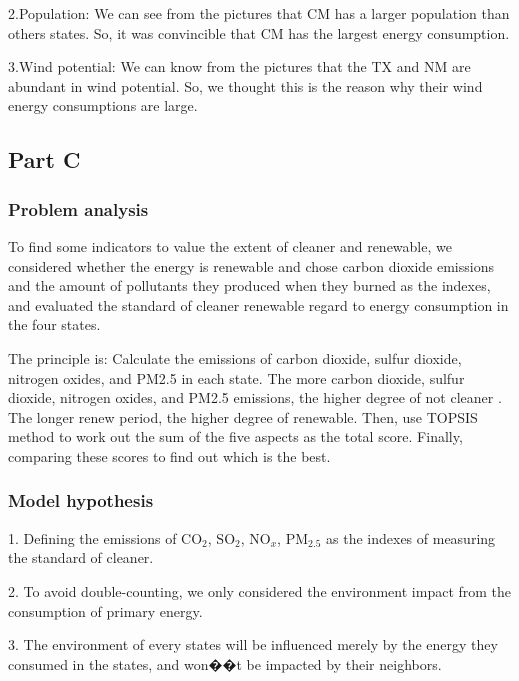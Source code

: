 \documentclass[12pt]{article}
\begin{document}
2.Population:
We can see from the pictures that CM has a larger population than others states.
So, it was convincible that CM has the largest energy consumption.

3.Wind potential:
We can know from the pictures that the TX and NM are abundant in wind potential.
So, we thought this is the reason why their wind energy consumptions are large.






\subsection{Part \uppercase\expandafter{}  C}



\subsubsection{Problem analysis}

To find some indicators to value the extent of cleaner and renewable, we considered whether the energy is renewable and chose carbon dioxide emissions and the amount of pollutants they produced when they burned as the indexes, and evaluated the standard of cleaner renewable regard to energy consumption in the four states.

The principle is: Calculate the emissions of carbon dioxide, sulfur dioxide, nitrogen oxides, and PM2.5 in each state. The more carbon dioxide, sulfur dioxide, nitrogen oxides, and PM2.5 emissions, the higher degree of not cleaner . The longer renew period, the higher degree of renewable. Then, use TOPSIS method to work out the sum of the five aspects as the total score. Finally, comparing these scores to find out which is the best.

\subsubsection{Model hypothesis}

1. Defining the emissions of $\mathrm{CO_{2}}$, $\mathrm{SO_{2}}$, $\mathrm{NO}_{x}$, $\mathrm{PM_{2.5}}$ as the indexes of measuring the standard
of cleaner.

2. To avoid double-counting, we only considered the environment impact from the
consumption of primary energy.

3. The environment of every states will be influenced merely by the energy they consumed in
the states, and won��t be impacted by their neighbors.
\end{document}
